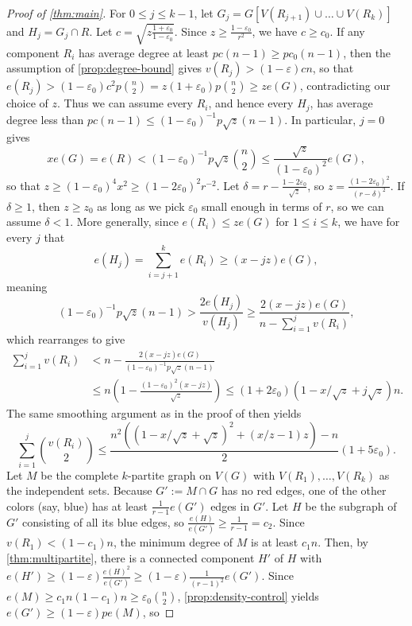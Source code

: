 \documentclass[12pt]{amsart}
\theoremstyle{definition}
\numberwithin{equation}{section}
\begin{document}
\begin{proof}[Proof of \cref{thm:main}]
    For $0\le j\le k-1$, let $G_j=G[V(R_{j+1})\cup\dots\cup V(R_k)]$ and $H_j=G_j\cap R$. Let $c=\sqrt{z\frac{1+\varepsilon_0}{1-\varepsilon_0}}$. Since $z\ge \frac{1-\varepsilon_0}{r^2}$, we have $c\ge c_0$. If any component $R_i$ has average degree at least $pc(n-1)\ge pc_0(n-1)$, then the assumption of \cref{prop:degree-bound} gives $v(R_j)> (1-\varepsilon)cn$, so that $e(R_j)> (1-\varepsilon_0)c^2 p\binom{n}{2}= z(1+\varepsilon_0)p\binom{n}{2}\ge ze(G)$, contradicting our choice of $z$. Thus we can assume every $R_i$, and hence every $H_j$, has average degree less than $pc(n-1)\le (1-\varepsilon_0)^{-1}p\sqrt{z}(n-1)$. In particular, $j=0$ gives
    \[
    x e(G)=e(R) < (1-\varepsilon_0)^{-1}p\sqrt{z} \binom{n}{2}\le \frac{\sqrt{z}}{(1-\varepsilon_0)^2}e(G),
    \]
    so that $z\ge (1-\varepsilon_0)^4x^2\ge (1-2\varepsilon_0)^2 r^{-2}$. Let $\delta=r-\frac{1-2\varepsilon_0}{\sqrt{z}}$, so $z=\frac{(1-2\varepsilon_0)^2}{(r-\delta)^2}$. If $\delta\ge 1$, then $z\ge z_0$ as long as we pick $\varepsilon_0$ small enough in terms of $r$, so we can assume $\delta<1$.
    More generally, since $e(R_i)\le ze(G)$ for $1\le i\le k$, we have for every $j$ that
    \[
        e(H_j)=\sum_{i=j+1}^k e(R_i)\ge (x-jz)e(G),
    \]
    meaning 
    \[
        (1-\varepsilon_0)^{-1}p\sqrt{z}(n-1) > \frac{2e(H_j)}{v(H_j)}\ge \frac{2(x-jz)e(G)}{n-\sum_{i=1}^j v(R_i)},
    \]
    which rearranges to give
    \begin{align*}
        \sum_{i=1}^j v(R_i)&< n-\frac{2(x-jz)e(G)}{(1-\varepsilon_0)^{-1}p\sqrt{z}(n-1)}\\
        &\le n (1-\frac{(1-\varepsilon_0)^2 (x-jz)}{\sqrt{z}})\le (1+2\varepsilon_0)(1-x/\sqrt{z}+j\sqrt{z})n.
    \end{align*}
	The same smoothing argument as in the proof of \cite[Lemma~3.2]{sluo} then yields
	\[\sum_{i=1}^j{{v(R_i)}\choose 2}\le \frac{n^2((1-x/\sqrt{z}+\sqrt{z})^2+(x/z-1)z)-n}2(1+5\varepsilon_0).\]
	Let $M$ be the complete $k$-partite graph on $V(G)$ with $V(R_1),\dots,V(R_k)$ as the independent sets.
	Because $G':=M\cap G$ has no red edges, one of the other colors (say, blue) has at least $\frac1{r-1}e(G')$ edges in $G'$. Let $H$ be the subgraph of $G'$ consisting of all its blue edges, so $\frac{e(H)}{e(G')}\ge \frac{1}{r-1}=c_2$. Since $v(R_1)<(1-c_1)n$, the minimum degree of $M$ is at least $c_1 n$. Then, by \cref{thm:multipartite}, there is a connected component $H'$ of $H$
	with $e(H')\ge (1-\varepsilon) \frac{e(H)^2}{e(G')} \ge (1-\varepsilon)\frac1{(r-1)^2}e(G')$. Since $e(M)\ge c_1 n (1-c_1) n \ge \varepsilon_0 \binom{n}{2}$, \cref{prop:density-control} yields $e(G')\ge (1-\varepsilon)pe(M)$, so

\end{proof}
\end{document}
